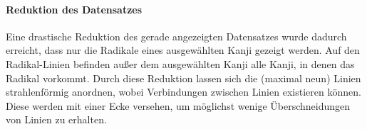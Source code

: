 \paragraph{Reduktion des Datensatzes}
Eine drastische Reduktion des gerade angezeigten Datensatzes wurde dadurch erreicht, dass nur die Radikale eines ausgewählten Kanji gezeigt werden. Auf den Radikal-Linien befinden außer dem ausgewählten Kanji alle Kanji, in denen das Radikal vorkommt. Durch diese Reduktion lassen sich die (maximal neun) Linien strahlenförmig anordnen, wobei Verbindungen zwischen Linien existieren können. Diese werden mit einer Ecke versehen, um möglichst wenige Überschneidungen von Linien zu erhalten. 